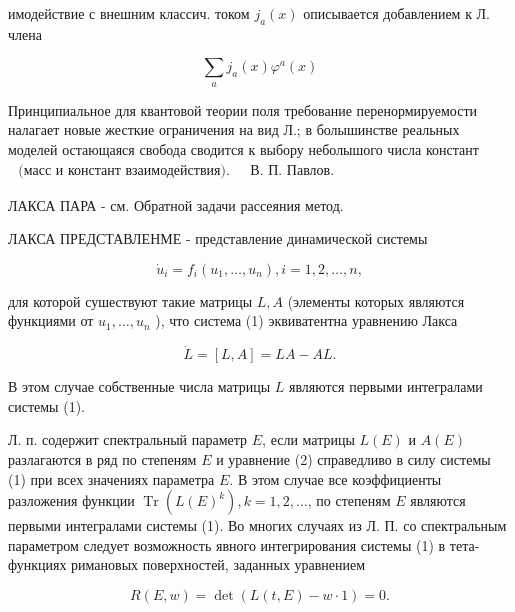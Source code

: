 \documentclass[10pt]{article}
\begin{document}
имодействие с внешним классич. током $j_{a}(x)$ описывается добавлением к Л. члена



\[

\sum_{a} j_{a}(x) \varphi^{a}(x)

\]



Принципиальное для квантовой теории поля требование перенормируемости налагает новые жесткие ограничения на вид Л.; в болышинстве реальных моделей остающаяся свобода сводится к выбору неболышого числа констант $\begin{array}{ll}\text { (масс и констант взаимодействия). } & \text { В. П. Павлов. }\end{array}$



ЛАКСА ПАРА - см. Обратной задачи рассеяния метод.



ЛАКСА ПРЕДСТАВЛЕНМЕ - представление динамической системы



\[

\dot{u}_{i}=f_{i}\left(u_{1}, \ldots, u_{n}\right), i=1,2, \ldots, n,

\]



для которой сушествуют такие матрицы $L, A$ (элементы которых являются функциями от $u_{1}, \ldots, u_{n}$ ), что система (1) эквиватентна уравнению Лакса



\[

\dot{L}=[L, A]=L A-A L .

\]



В этом случае собственные числа матрицы $L$ являются первыми интегралами системы (1).



Л. п. содержит спектральный параметр $E$, если матрицы $L(E)$ и $A(E)$ разлагаются в ряд по степеням $E$ и уравнение (2) справедливо в силу системы (1) при всех значениях параметра $E$. В этом случае все коэффициенты разложения функции $\operatorname{Tr}\left(L(E)^{k}\right), k=1,2, \ldots$, по степеням $E$ являются первыми интегралами системы (1). Во многих случаях из Л. П. со спектральным параметром следует возможность явного интегрирования системы (1) в тета-функциях римановых поверхностей, заданных уравнением



\[

R(E, w)=\operatorname{det}(L(t, E)-w \cdot 1)=0 .

\]
\end{document}
